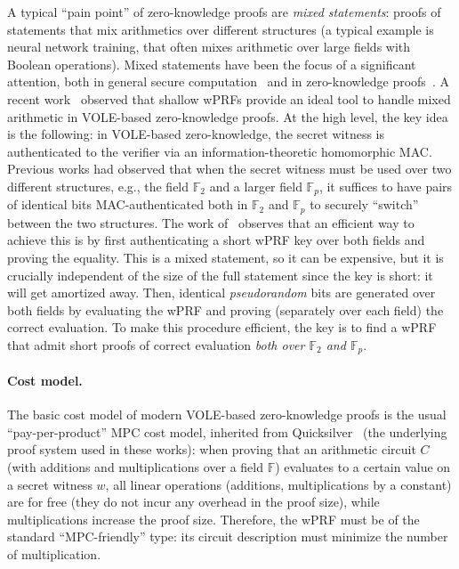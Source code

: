 \documentclass[journal=tosc,submission]{iacrtrans}
\theoremstyle{theorem}
\newcommand\F{\mathbb{F}}
\begin{document}
A typical ``pain point'' of zero-knowledge proofs are \emph{mixed statements}: proofs of statements that mix arithmetics over different structures (a typical example is neural network training, that often mixes arithmetic over large fields with Boolean operations). Mixed statements have been the focus of a significant attention, both in general secure computation~\cite{NDSS:DemSchZoh15,SP:GYKW24,EC:BCGGIK21} and in zero-knowledge proofs~\cite{C:ChaGanMoh16,CCS:BBMRS21,EPRINT:OKMZ24,DBLP:conf/eurocrypt/AgarwalBBS25}. A recent work~\cite{DBLP:conf/eurocrypt/AgarwalBBS25} observed that shallow wPRFs provide an ideal tool to handle mixed arithmetic in VOLE-based zero-knowledge proofs. At the high level, the key idea is the following: in VOLE-based zero-knowledge, the secret witness is authenticated to the verifier via an information-theoretic homomorphic MAC. Previous works had observed that when the secret witness must be used over two different structures, e.g., the field $\F_2$ and a larger field $\F_p$, it suffices to have pairs of identical bits MAC-authenticated both in $\F_2$ and $\F_p$ to securely ``switch'' between the two structures. The work of~\cite{DBLP:conf/eurocrypt/AgarwalBBS25} observes that an efficient way to achieve this is by first authenticating a short wPRF key over both fields and proving the equality. This is a mixed statement, so it can be expensive, but it is crucially independent of the size of the full statement since the key is short: it will get amortized away. Then, identical \emph{pseudorandom} bits are generated over both fields by evaluating the wPRF and proving (separately over each field) the correct evaluation. To make this procedure efficient, the key is to find a wPRF that admit short proofs of correct evaluation \emph{both over $\F_2$ and $\F_p$}.

\paragraph{Cost model.} The basic cost model of modern VOLE-based zero-knowledge proofs is the usual ``pay-per-product'' MPC cost model, inherited from {\sf Quicksilver}~\cite{CCS:YSWW21} (the underlying proof system used in these works): when proving that an arithmetic circuit $C$ (with additions and multiplications over a field $\F$) evaluates to a certain value on a secret witness $w$, all linear operations (additions, multiplications by a constant) are for free (they do not incur any overhead in the proof size), while multiplications increase the proof size. Therefore, the wPRF must be of the standard ``MPC-friendly'' type: its circuit description must minimize the number of multiplication.
\end{document}
